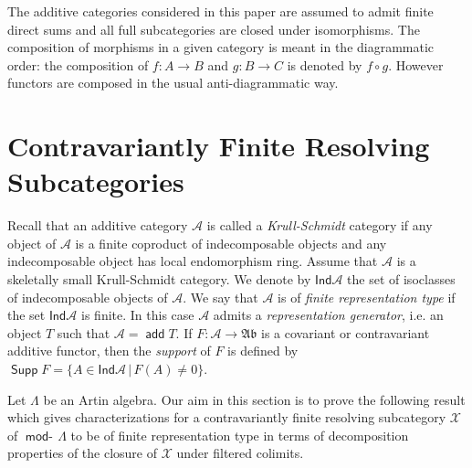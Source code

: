 \documentclass[oneside, a4paper,reqno]{amsart}
\numberwithin{equation}{section}
\theoremstyle{definition}
\begin{document}
The additive categories considered in this paper are assumed to
admit finite direct sums and all full subcategories are closed under
isomorphisms.  The composition of morphisms in a given category is
meant in the diagrammatic order: the composition of  $f \colon A
{\longrightarrow} B$ and $g \colon B {\longrightarrow} C$ is denoted by $f \circ g$. However functors are composed in the usual anti-diagrammatic way.

 \section{Contravariantly Finite Resolving Subcategories}
Recall that an additive category ${\mathscr A}$ is called a {\em
Krull-Schmidt} category if any object of ${\mathscr A}$ is a finite coproduct
of indecomposable objects and any indecomposable object has local
endomorphism ring.
 Assume that ${\mathscr A}$ is a skeletally small
Krull-Schmidt category. We denote by $\mathsf{Ind}{\mathscr A}$ the set of
isoclasses of indecomposable objects of ${\mathscr A}$. We say that ${\mathscr A}$ is of
{\em finite representation type} if the set $\mathsf{Ind}{\mathscr A}$ is
finite. In this case ${\mathscr A}$ admits a {\em representation generator},
i.e. an object $T$ such that ${\mathscr A} = \operatorname*{\mathsf{add}} T$. If $F : {\mathscr A} {\longrightarrow} {\mathfrak{Ab}}$ is
a covariant or contravariant additive functor,  then the {\em
support} of $F$ is defined by $\operatorname*{\mathsf{Supp}} F = \{A \in \mathsf{Ind}{\mathscr A} \,
| \, F(A) \neq 0\}$.

Let $\Lambda$ be an Artin algebra. Our aim in this section is to
prove the following result which gives
 characterizations for a contravariantly finite resolving
 subcategory ${\mathcal X}$ of $\operatorname*{\mathsf{mod}-\!}\Lambda$
 to be of finite representation type in terms of decomposition properties of
  the closure of ${\mathcal X}$ under filtered colimits.
\end{document}
